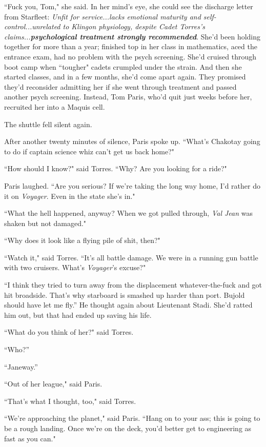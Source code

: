 \documentclass[twoside,letterpaper,12pt]{memoir}
\begin{document}
``Fuck you, Tom," she said. In her mind's eye, she could see the discharge letter from Starfleet: \textit{Unfit for service...lacks emotional maturity and self-control...unrelated to Klingon physiology, despite Cadet Torres's claims...\textbf{psychological treatment strongly recommended}}. She'd been holding together for more than a year; finished top in her class in mathematics, aced the entrance exam, had no problem with the psych screening. She'd cruised through boot camp when ``tougher" cadets crumpled under the strain. And then she started classes, and in a few months, she'd come apart again. They promised they'd reconsider admitting her if she went through treatment and passed another psych screening. Instead, Tom Paris, who'd quit just weeks before her, recruited her into a Maquis cell.

The shuttle fell silent again.

After another twenty minutes of silence, Paris spoke up. ``What's Chakotay going to do if captain science whiz can't get us back home?"

``How should I know?" said Torres. ``Why? Are you looking for a ride?"

Paris laughed. ``Are you serious? If we're taking the long way home, I'd rather do it on \textit{Voyager}. Even in the state she's in."

``What the hell happened, anyway? When we got pulled through, \textit{Val Jean} was shaken but not damaged."

``Why does it look like a flying pile of shit, then?"

``Watch it," said Torres. ``It’s all battle damage. We were in a running gun battle with two cruisers. What's \textit{Voyager}'s excuse?"

``I think they tried to turn away from the displacement whatever-the-fuck and got hit broadside. That’s why starboard is smashed up harder than port. Bujold should have let me fly.” He thought again about Lieutenant Stadi. She’d ratted him out, but that had ended up saving his life.

``What do you think of her?" said Torres.

``Who?”

``Janeway.”

``Out of her league," said Paris.

``That's what I thought, too," said Torres.

``We're approaching the planet," said Paris. ``Hang on to your ass; this is going to be a rough landing. Once we're on the deck, you'd better get to engineering as fast as you can."
\end{document}
